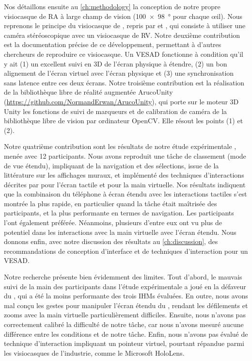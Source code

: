 Nos détaillons ensuite au \autoref{ch:methodology} la conception de notre propre visiocasque de RA à large champ de vision (\SI{100x98}{\degree} pour chaque \oe il). Nous reprenons le principe du visiocasque de \cite{Steptoe2013}, repris par \cite{Steptoe2014} et \cite{Piumsomboon2014}, qui consiste à utiliser une caméra stéréoscopique  avec un visiocasque de RV. Notre deuxième contribution est la documentation précise de ce développement, permettant à d'autres chercheurs de reproduire ce visiocasque. Un VESAD fonctionne à condition qu'il y ait (1) un excellent suivi en 3D de l'écran physique à étendre, (2) un bon alignement de l'écran virtuel avec l'écran physique et (3) une synchronisation sans latence entre ces deux écrans. Notre troisième contribution est la réalisation de la bibliothèque libre de réalité augmentée ArucoUnity (\url{https://github.com/NormandErwan/ArucoUnity}), qui porte sur le moteur 3D Unity les fonctions de suivi de marqueurs et de calibration de caméra de la bibliothèque libre de vision par ordinateur OpenCV. Elle résout les points (1) et (2).

Notre quatrième contribution sont les résultats de notre étude expérimentale , menée avec 12 participants. Nous avons reproduit une tâche de classement (mode de vue étendu), impliquant de la navigation et des sélections, issue de la littérature sur les affichages muraux, et implémenté des techniques d'interactions décrites par \cite{Wobbrock2009} pour l'écran tactile et \cite{Piumsomboon2013} pour la main virtuelle. Nos résultats indiquent que la combinaison du téléphone à écran étendu avec les interactions tactiles s'est montrée la plus rapide, en particulier quand la tâche était maîtrisée des participants, et la plus performante en termes de navigation. Les participants l'ont également préférée. Néanmoins, plusieurs d'entre eux ont vu plus de potentiel dans les interactions avec la main virtuelle avec l'écran étendu. Nous donnons enfin, avec notre discussion des résultats au \autoref{ch:discussion}, des recommandations de conception d'interface et de techniques d'interaction pour un VESAD.

Notre recherche présente bien évidemment des limites. Tout d'abord, le mauvais suivi de la main des participants dans l'étude expérimentale a joué en la défaveur du , qui a été la moins performante des trois IHMs évaluées. En outre, nous avons mal conçu les gestes pour manipuler l'écran étendu du , rendant les défilements et zooms avec la main virtuelle particulièrement difficiles. Ensuite, nous n'avons pas correctement calibré la difficulté de notre tâche, car nous n'avons mesuré aucune différence entre les conditions  et  de notre tâche. Enfin, nous n'avons pas évalué de technique d'interaction impliquant un pointeur virtuel, pourtant répandue parmi les visiocasques de l'industrie, comme le Microsoft HoloLens.

